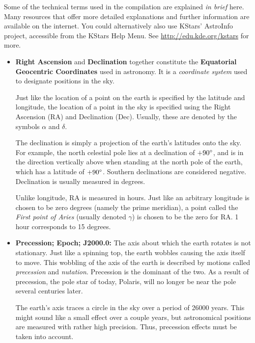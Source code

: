 Some of the technical terms used in the compilation are explained
\emph{in brief} here. Many resources that offer more detailed
explanations and further information are available on the
internet. You could alternatively also use KStars' AstroInfo project,
accessible from the KStars Help Menu. See
\url{http://edu.kde.org/kstars} for more.

\begin{itemize}
\item \textbf{Right Ascension} and \textbf{Declination} together
  constitute the \textbf{Equatorial Geocentric Coordinates} used in
  astronomy. It is a \emph{coordinate system} used to designate
  positions in the sky.

  Just like the location of a point on the earth is specified by the
  latitude and longitude, the location of a point in the sky is
  specified using the Right Ascension (RA) and Declination
  (Dec). Usually, these are denoted by the symbols $\alpha$ and
  $\delta$.
  
  The declination is simply a projection of the earth's latitudes onto
  the sky. For example, the north celestial pole lies at a declination
  of $+90^\circ$, and is in the direction vertically above when
  standing at the north pole of the earth, which has a latitude of
  $+90^\circ$. Southern declinations are considered
  negative. Declination is usually measured in degrees.

  Unlike longitude, RA is measured in hours. Just like an arbitrary
  longitude is chosen to be zero degrees (namely the prime meridian),
  a point called the \emph{First point of Aries} (usually denoted
  $\gamma$) is chosen to be the zero for RA. 1 hour corresponds to 15
  degrees.

\item \textbf{Precession; Epoch; J2000.0:} The axis about which the
  earth rotates is not stationary. Just like a spinning top, the earth
  wobbles causing the axis itself to move. This wobbling of the axis
  of the earth is described by motions called \emph{precession} and
  \emph{nutation}. Precession is the dominant of the two. As a result
  of precession, the pole star of today, Polaris, will no longer be
  near the pole several centuries later.

  The earth's axis traces a circle in the sky over a period of 26000
  years. This might sound like a small effect over a couple years, but
  astronomical positions are measured with rather high
  precision. Thus, precession effects must be taken into account.


\end{itemize}
